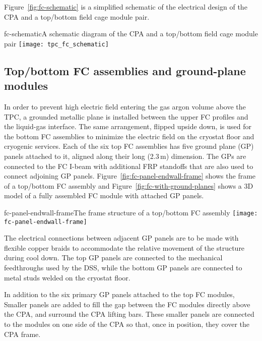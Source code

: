 Figure~\ref{fig:fc-schematic} is a simplified schematic of the electrical design of  the CPA and a top/bottom field cage module pair.

\begin{cdrfigure}{fc-schematic}{A schematic diagram of the CPA and a top/bottom field cage module pair}
\texttt{[image: tpc\_fc\_schematic]}
\end{cdrfigure}

\subsection{Top/bottom FC assemblies and ground-plane modules}

In order to prevent high electric field entering the gas argon volume above the TPC, a grounded metallic plane is installed between the upper FC profiles and the liquid-gas interface. The same arrangement, flipped upside down, is used for the bottom FC assemblies to minimize the electric field on the cryostat floor and cryogenic services. 
Each of the six top FC assemblies has five ground plane (GP) panels attached to it, aligned 
along their long %
(2.3\,m) dimension. The GPs are connected to the FC I-beam 
with additional FRP standoffs that are also used to connect adjoining GP panels. 
Figure~\ref{fig:fc-panel-endwall-frame} shows the frame of a top/bottom FC assembly and 
Figure~\ref{fig:fc-with-ground-planes} shows a 3D model of a fully assembled FC module with attached GP panels.

\begin{cdrfigure}{fc-panel-endwall-frame}{The frame structure of a top/bottom FC assembly}
\texttt{[image: fc-panel-endwall-frame]}
\end{cdrfigure}


The electrical connections between adjacent GP panels are to be made 
with flexible copper braids to accommodate the relative movement of the structure during cool down.  The top GP panels are connected to the mechanical feedthroughs used by the DSS, while the bottom GP panels are connected to metal studs welded on the cryostat floor.

In addition to the six primary GP panels attached to the top FC modules,
Smaller panels are added to fill the gap between the FC modules directly above the CPA, and surround the CPA lifting bars. These smaller panels are connected to the modules on one side of the CPA so that, once in position, they 
cover the CPA frame. 


